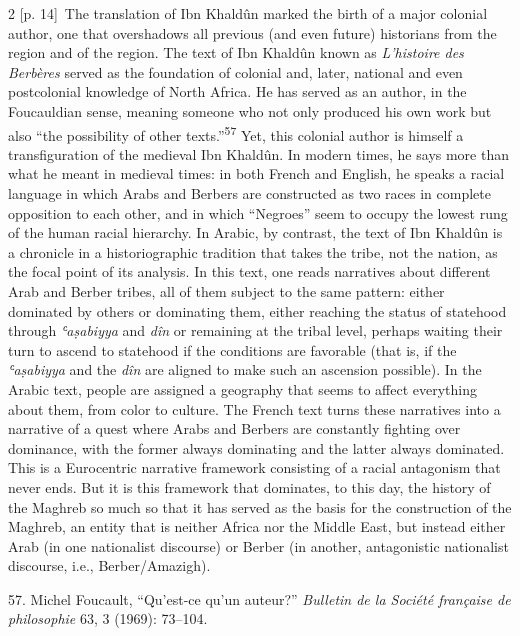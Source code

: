 \documentclass[10pt,a4paper]{article}
\begin{document}
\begin{paracol}{2}
{\scriptsize\color{gray} [p. 14]}\ The translation of Ibn Khaldûn marked the birth of a major colonial author, one that overshadows all previous (and even future) historians from the region and of the region. The text of Ibn Khaldûn known as \textit{L’histoire des Berbères} served as the foundation of colonial and, later, national and even postcolonial knowledge of North Africa. He has served as an author, in the Foucauldian sense, meaning someone who not only produced his own work but also “the possibility of other texts.”\nobreak\textsuperscript{57} Yet, this colonial author is himself a transfiguration of the medieval Ibn Khaldûn. In modern times, he says more than what he meant in medieval times: in both French and English, he speaks a racial language in which Arabs and Berbers are constructed as two races in complete opposition to each other, and in which “Negroes” seem to occupy the lowest rung of the human racial hierarchy. In Arabic, by contrast, the text of Ibn Khaldûn is a chronicle in a historiographic tradition that takes the tribe, not the nation, as the focal point of its analysis. In this text, one reads narratives about different Arab and Berber tribes, all of them subject to the same pattern: either dominated by others or dominating them, either reaching the status of statehood through \textit{ʿaṣabiyya} and \textit{dîn} or remaining at the tribal level, perhaps waiting their turn to ascend to statehood if the conditions are favorable (that is, if the \textit{ʿaṣabiyya} and the \textit{dîn} are aligned to make such an ascension possible). In the Arabic text, people are assigned a geography that seems to affect everything about them, from color to culture. The French text turns these narratives into a narrative of a quest where Arabs and Berbers are constantly fighting over dominance, with the former always dominating and the latter always dominated. This is a Eurocentric narrative framework consisting of a racial antagonism that never ends. But it is this framework that dominates, to this day, the history of the Maghreb so much so that it has served as the basis for the construction of the Maghreb, an entity that is neither Africa nor the Middle East, but instead either Arab (in one nationalist discourse) or Berber (in another, antagonistic nationalist discourse, i.e., Berber/Amazigh).\par{\small 57. Michel Foucault, “Qu’est-ce qu’un auteur?” \textit{Bulletin de la Société française de philosophie} 63, 3 (1969): 73–104.\par}
\switchcolumn*

\end{paracol}
\end{document}

